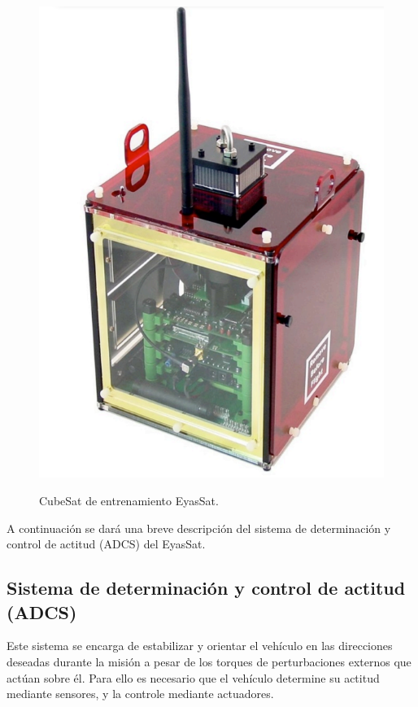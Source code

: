 \begin{figure}[!ht]
	\begin{center}
		\includegraphics[scale=0.40]{imagenes/marco_teorico/eyassat.PNG}\\
	\end{center}
	\caption{CubeSat de entrenamiento EyasSat.}
	\label{fig:eyassat}
\end{figure}

A continuación se dará una breve descripción del sistema de determinación y control de actitud (ADCS) del EyasSat.
\subsection{Sistema de determinación y control de actitud (ADCS)}\label{sub:adcs}

Este sistema se encarga de estabilizar y orientar el vehículo en las direcciones deseadas durante la misión a pesar de los torques de perturbaciones externos que actúan sobre él. Para ello es necesario que el vehículo determine su actitud mediante sensores, y la controle mediante actuadores.

